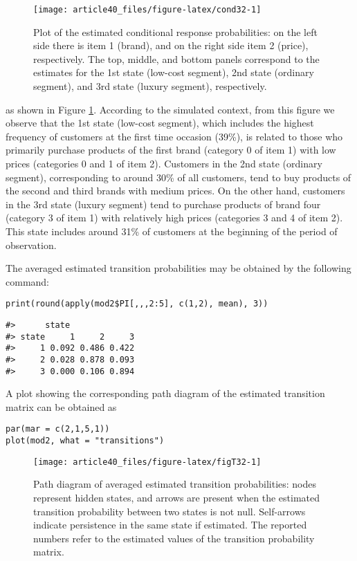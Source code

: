 \begin{figure}

{\centering \texttt{[image: article40\_files/figure-latex/cond32-1]} 

}

\caption{Plot of the estimated conditional response probabilities: on the left side there is item 1 (brand), and on the right side item 2 (price), respectively. The top, middle, and bottom panels correspond to the estimates for the 1st state (low-cost segment), 2nd state (ordinary segment), and 3rd state (luxury segment), respectively.}\label{fig:cond32}
\end{figure}

\noindent as shown in Figure \ref{fig:cond32}. According to the simulated context, from this figure we observe that the 1st state (low-cost segment), which includes the highest frequency of customers at
the first time occasion (39\%), is related to those who primarily
purchase products of the first brand (category 0 of item 1) with low
prices (categories 0 and 1 of item 2). Customers in the 2nd state
(ordinary segment), corresponding to around 30\% of all customers, tend
to buy products of the second and third brands with medium prices. On
the other hand, customers in the 3rd state (luxury segment) tend to
purchase products of brand four (category 3 of item 1) with relatively
high prices (categories 3 and 4 of item 2). This state includes around
31\% of customers at the beginning of the period of observation.

The averaged estimated transition probabilities may be obtained by the
following command:

\begin{verbatim}
print(round(apply(mod2$PI[,,,2:5], c(1,2), mean), 3))
\end{verbatim}

\begin{verbatim}
#>      state
#> state     1     2     3
#>     1 0.092 0.486 0.422
#>     2 0.028 0.878 0.093
#>     3 0.000 0.106 0.894
\end{verbatim}

A plot showing the corresponding path diagram of the estimated
transition matrix can be obtained as

\begin{verbatim}
par(mar = c(2,1,5,1))
plot(mod2, what = "transitions")
\end{verbatim}

\begin{figure}

{\centering \texttt{[image: article40\_files/figure-latex/figT32-1]} 

}

\caption{Path diagram of averaged estimated transition probabilities: nodes represent hidden states, and arrows are present when the estimated transition probability between two states is not null. Self-arrows indicate persistence in the same state if estimated. The reported numbers refer to the estimated values of the transition probability matrix.}\label{fig:figT32}
\end{figure}

